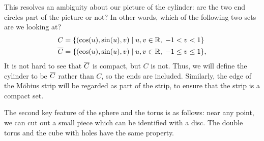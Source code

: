 \documentclass[reqno]{amsart}
\theoremstyle{definition}
\begin{document}
This resolves an ambiguity about our picture of the cylinder: are the
two end circles part of the picture or not?  In other words, which of
the following two sets are we looking at?
\begin{align*}
 C      &= \{(\cos(u),\sin(u),v) \;|\; u,v\in\mathbb{R},\; -1<v<1\} \\
 \overline{C} &= \{(\cos(u),\sin(u),v) \;|\; u,v\in\mathbb{R},\; -1\leq v\leq 1\},
\end{align*}
It is not hard to see that $\overline{C}$ is compact, but $C$ is not.  Thus,
we will define the cylinder to be $\overline{C}$ rather than $C$, so the
ends are included.  Similarly, the edge of the M\"obius strip will be
regarded as part of the strip, to ensure that the strip is a compact
set. 

The second key feature of the sphere and the torus is as follows: near any
point, we can cut out a small piece which can be identified with a
disc.  The double torus and the cube with holes have the same
property.  
\end{document}
